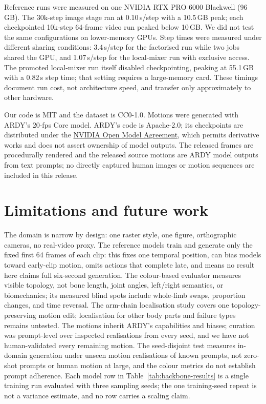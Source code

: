 \documentclass[10pt,twocolumn]{article}
\begin{document}
Reference runs were measured on one NVIDIA RTX PRO 6000 Blackwell (96\,GB). The 30k-step image stage ran at
0.10\,s/step with a 10.5\,GB peak; each checkpointed 10k-step 64-frame video run peaked below 10\,GB.
We did not test the same configurations on lower-memory GPUs.
Step times were measured under different sharing conditions: 3.4\,s/step for the factorised run while two
jobs shared the GPU, and 1.07\,s/step for the local-mixer run with exclusive access. The promoted
local-mixer run itself disabled checkpointing, peaking at 55.1\,GB with a 0.82\,s step time; that setting
requires a large-memory card. These timings document run cost, not architecture speed, and transfer only
approximately to other hardware.

Our code is MIT and the dataset is CC0-1.0. Motions were generated with ARDY's 20-fps Core model. ARDY's
code is Apache-2.0; its checkpoints are distributed under the
\href{https://www.nvidia.com/en-us/agreements/enterprise-software/nvidia-open-model-agreement/}{NVIDIA Open
Model Agreement}, which permits derivative works and does not assert ownership of model outputs. The released
frames are procedurally rendered and the released source motions are ARDY model outputs from text prompts; no
directly captured human images or motion sequences are included in this release.

\section{Limitations and future work}\label{sec:future}
The domain is narrow by design: one raster style, one figure, orthographic cameras, no real-video proxy. The
reference models train and generate only the fixed first 64 frames of each clip: this fixes one temporal
position, can bias models toward early-clip motion, omits actions that complete late, and means no result
here claims full six-second generation. The colour-based evaluator measures visible topology, not bone
length, joint angles, left/right semantics, or biomechanics; its measured blind spots include whole-limb
swaps, proportion changes, and time reversal. The arm-chain localisation study covers one topology-preserving motion edit; localisation for other body
parts and failure types remains untested. The
motions inherit ARDY's capabilities and biases; curation
was prompt-level over inspected realisations from every seed, and we have not human-validated every remaining
motion. The seed-disjoint test measures in-domain generation under unseen motion realisations of known
prompts, not zero-shot prompts or human motion at large, and the colour metrics do not establish prompt
adherence. Each model row in Table~\ref{tab:backbone-results} is a single training run evaluated with three
sampling seeds; the one training-seed repeat is not a variance estimate, and no row carries a scaling claim.
\end{document}
